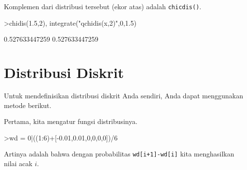 \documentclass[a4paper,11pt,oneside,enabledeprecatedfontcommands]{scrbook}
\newenvironment{eulernotebook}{}{}
\newcommand{\eulerheading}[1]{\chapter{#1}}
\newenvironment{eulercomment}{\par\medskip\noindent}{\par\medskip}
\begin{document}
\begin{eulernotebook}
\begin{eulercomment}
			Komplemen dari distribusi tersebut (ekor atas) adalah \texttt{chicdis()}.
		\end{eulercomment}
		\begin{eulerprompt}
			>chidis(1.5,2), integrate("qchidis(x,2)",0,1.5)
		\end{eulerprompt}
		\begin{euleroutput}
			0.527633447259
			0.527633447259
		\end{euleroutput}
		
		\eulerheading{Distribusi Diskrit}
		\begin{eulercomment}
			Untuk mendefinisikan distribusi diskrit Anda sendiri, Anda dapat menggunakan metode berikut.
			
			Pertama, kita mengatur fungsi distribusinya.
		\end{eulercomment}
		\begin{eulerprompt}
			>wd = 0|((1:6)+[-0.01,0.01,0,0,0,0])/6
		\end{eulerprompt}
		\begin{euleroutput}
			[0,  0.165,  0.335,  0.5,  0.666667,  0.833333,  1]
		\end{euleroutput}
		\begin{eulercomment}
			Artinya adalah bahwa dengan probabilitas \texttt{wd[i+1]-wd[i]} kita menghasilkan nilai acak $i$.
			

\end{eulercomment}
\end{eulernotebook}
\end{document}

